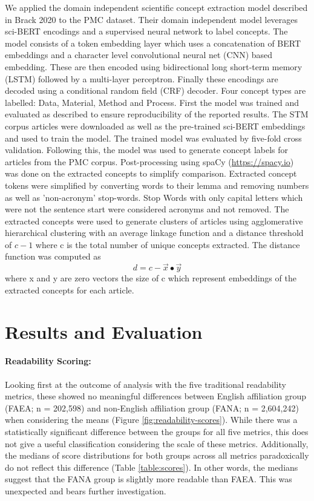 \documentclass[11pt,a4paper]{article}
\begin{document}
We applied the domain independent scientific concept extraction model described in Brack 2020 to the PMC dataset. Their domain independent model leverages sci-BERT \cite{Beltagy2019-vz} encodings and a supervised neural network to label concepts. The model consists of a token embedding layer which uses a concatenation of BERT embeddings and a character level convolutional neural net (CNN) based embedding. These are then encoded using bidirectional long short-term memory (LSTM) followed by a multi-layer perceptron. Finally these encodings are decoded using a conditional random field (CRF) decoder. Four concept types are labelled: Data, Material, Method and Process.
First the model was trained and evaluated as described  \cite{Brack2020-id} to ensure reproducibility of the reported results. The STM corpus articles were downloaded as well as the pre-trained sci-BERT embeddings and used to train the model. The trained model was evaluated by five-fold cross validation. Following this, the model was used to generate concept labels for articles from the PMC corpus. Post-processing using spaCy (\url{https://spacy.io}) was done on the extracted concepts to simplify comparison. Extracted concept tokens were simplified by converting words to their lemma and removing numbers as well as 'non-acronym’ stop-words. Stop Words with only capital letters which were not the sentence start were considered acronyms and not removed. The extracted concepts were used to generate clusters of articles using agglomerative hierarchical clustering with an average linkage function and a distance threshold of \( c - 1 \) where c is the total number of unique concepts extracted. \newline \newline The distance function was computed as 
\begin{equation}
d = c - \vec{x} \bullet \vec{y} 
\end{equation}
where x and y are zero vectors the size of c which represent embeddings of the extracted concepts for each article. 

\section{Results and Evaluation}

\paragraph{Readability Scoring:} Looking first at the outcome of analysis with the five traditional readability metrics, these showed no meaningful differences between English affiliation group (FAEA; n = 202,598)  and non-English affiliation group (FANA; n = 2,604,242) when considering the means (Figure \ref{fig:readability-scores}). While there was a statistically significant difference between the groups for all five metrics, this does not give a useful classification considering the scale of these metrics. Additionally, the medians of score distributions for both groups across all metrics paradoxically do not reflect this difference (Table \ref{table:scores}). In other words, the medians suggest that the FANA group is slightly more readable than FAEA. This was unexpected and bears further investigation.
\end{document}
